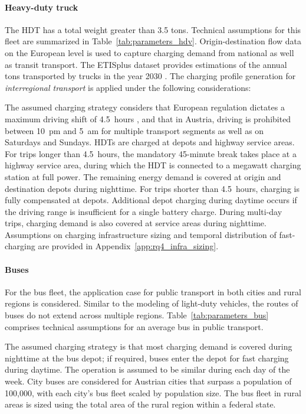             \paragraph*{Heavy-duty truck}
            The \ac{HDT} has a total weight greater than 3.5 tons. Technical assumptions for this fleet are summarized in Table~\ref{tab:parameters_hdv}. Origin-destination flow data on the European level is used to capture charging demand from national as well as transit transport. The ETISplus dataset provides estimations of the annual tons transported by trucks in the year 2030 \cite{Speth2021}. The charging profile generation for \textit{interregional transport} is applied under the following considerations:
            
            The assumed charging strategy considers that European regulation dictates a maximum driving shift of 4.5~hours \cite{ec_driving_time_2023}, and that in Austria, driving is prohibited between 10~pm and 5~am for multiple transport segments \cite{usp_lkw_fahrverbote} as well as on Saturdays and Sundays. \acp{HDT} are charged at depots and highway service areas. For trips longer than 4.5~hours, the mandatory 45-minute break takes place at a highway service area, during which the \ac{HDT} is connected to a megawatt charging station at full power. The remaining energy demand is covered at origin and destination depots during nighttime. For trips shorter than 4.5~hours, charging is fully compensated at depots. Additional depot charging during daytime occurs if the driving range is insufficient for a single battery charge. During multi-day trips, charging demand is also covered at service areas during nighttime.
            Assumptions on charging infrastructure sizing and temporal distribution of fast-charging are provided in Appendix~\ref{app:rq4_infra_sizing}.
            
        \paragraph*{Buses}
        For the bus fleet, the application case for public transport in both cities and rural regions is considered. Similar to the modeling of light-duty vehicles, the routes of buses do not extend across multiple regions. Table~\ref{tab:parameters_bus} comprises technical assumptions for an average bus in public transport.

            The assumed charging strategy is that most charging demand is covered during nighttime at the bus depot; if required, buses enter the depot for fast charging during daytime. The operation is assumed to be similar during each day of the week. City buses are considered for Austrian cities that surpass a population of 100,000, with each city's bus fleet scaled by population size. The bus fleet in rural areas is sized using the total area of the rural region within a federal state.

